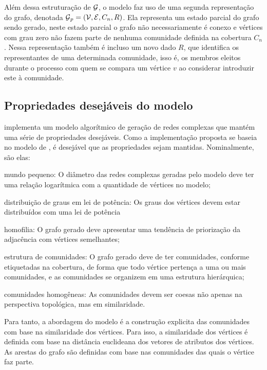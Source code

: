 \documentclass[notes.tex]{subfiles}
\begin{document}
Além dessa estruturação de $\operatorname{\mathcal{G}}$, o modelo faz uso de uma segunda representação do grafo, denotada  $\operatorname{\mathcal{G}}_p = (\operatorname{\mathcal{V}}, \operatorname{\mathcal{E}}, C_n, R)$.
Ela representa um estado parcial do grafo sendo gerado, neste estado parcial o grafo não necessariamente é conexo e vértices com grau zero não fazem parte de nenhuma comunidade definida na cobertura $C_n$.
Nessa representação também é incluso um novo dado $R$, que identifica os representantes de uma determinada comunidade, isso é, os membros eleitos durante o processo com quem se compara um vértice $v$ ao considerar introduzir este à comunidade.

\subsection{Propriedades desejáveis do modelo}

 implementa um modelo algorítmico de geração de redes complexas que mantém uma série de propriedades desejáveis.
Como a implementação proposta se baseia no modelo de , é desejável que as propriedades sejam mantidas.
Nominalmente, são elas:

\begin{alineas}
    \item mundo pequeno: O diâmetro das redes complexas geradas pelo modelo deve ter uma relação logarítmica com a quantidade de vértices no modelo;
    \item distribuição de graus em lei de potência: Os graus dos vértices devem estar distribuídos com uma lei de potência
    \item homofilia: O grafo gerado deve apresentar uma tendência de priorização da adjacência com vértices semelhantes;
    \item estrutura de comunidades: O grafo gerado deve de ter comunidades, conforme etiquetadas na cobertura, de forma que todo vértice pertença a uma ou mais comunidades, e as comunidades se organizem em uma estrutura hierárquica;
    \item comunidades homogêneas: As comunidades devem ser coesas não apenas na perspectiva topológica, mas em similaridade.
\end{alineas}

Para tanto, a abordagem do modelo é a construção explicita das comunidades com base na similaridade dos vértices.
Para isso, a similaridade dos vértices é definida com base na distância euclideana dos vetores de atributos dos vértices.
As arestas do grafo são definidas com base nas comunidades das quais o vértice faz parte.
\end{document}
